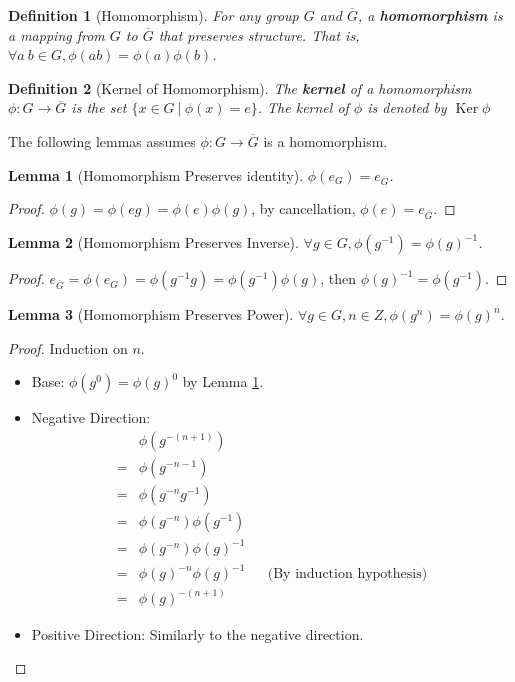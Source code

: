 \documentclass[14pt]{extarticle}
\newtheorem{lemma}{Lemma}[section]
\newtheorem{definition}{Definition}[section]
\DeclareMathOperator{\Ker}{Ker}
\newcommand{\inv}[1]{#1^{-1}}
\newcommand{\1}{\{e\}}
\begin{document}
\begin{definition}[Homomorphism]
  For any group $G$ and $\overline{G}$, a 
  \textbf{homomorphism}
  is a mapping from $G$ to $\overline{G}$ that preserves structure.
  That is, $\forall a \ b \in G, \phi(ab) = \phi(a)\phi(b)$.
\end{definition}

\begin{definition}[Kernel of Homomorphism]
  The \textbf{kernel} of a homomorphism $\phi : G \rightarrow \overline{G}$
  is the set $\{ x \in G \ | \ \phi(x) = e \}$. 
  The kernel of $\phi$ is denoted by $\Ker \phi$
\end{definition}

The following lemmas assumes $\phi : G \rightarrow \overline{G}$ is a homomorphism.

\begin{lemma}[Homomorphism Preserves identity]
  \label{lemma10.1}
  $\phi(e_G) = e_{\overline{G}}$.
\end{lemma}
\begin{proof}
  $\phi(g) = \phi(eg) = \phi(e) \phi(g)$, by cancellation, $\phi(e) = e_{\overline{G}}$.
\end{proof}

\begin{lemma}[Homomorphism Preserves Inverse]
  $\forall g \in G, \phi(\inv{g}) = \inv{\phi(g)}$.
\end{lemma}
\begin{proof}
  $e_{\overline{G}} = \phi(e_G) = \phi(\inv{g}g) = \phi(\inv{g}) \phi(g)$, then $\inv{\phi(g)} = \phi(\inv{g})$.
\end{proof}

\begin{lemma}[Homomorphism Preserves Power]
  $\forall g \in G, n \in Z, \phi(g^n) = \phi(g)^n$.
\end{lemma}
\begin{proof}
  Induction on $n$.
  \begin{itemize}
    \item Base: $\phi(g^0) = \phi(g)^0$ by Lemma \ref{lemma10.1}.
    \item Negative Direction: 
      \begin{align*}
         & \phi(g^{-(n + 1)}) \\
        =& \phi(g^{-n - 1}) \\
        =& \phi(g^{-n} \inv{g}) \\
        =& \phi(g^{-n})\phi(\inv{g}) \\
        =& \phi(g^{-n})\inv{\phi(g)} \\
        =& \phi(g)^{-n}\inv{\phi(g)} && \text{(By induction hypothesis)} \\
        =& \phi(g)^{-(n + 1)}
      \end{align*}
    \item Positive Direction: Similarly to the negative direction.
  \end{itemize}
\end{proof}
\end{document}
